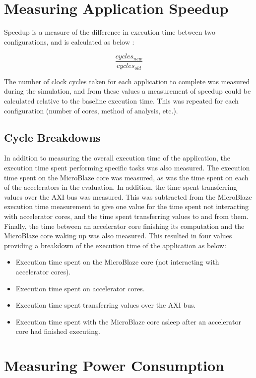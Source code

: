 \documentclass{UoYCSproject}
\begin{document}
\section{Measuring Application Speedup}

Speedup is a measure of the difference in execution time between two configurations, and is calculated as below
\cite{computer-arch}:

\[\frac{cycles_{new}}{cycles_{old}}\]

The number of clock cycles taken for each application to complete was measured during the simulation, and from these
values a measurement of speedup could be calculated relative to the baseline execution time. This was repeated for
each configuration (number of cores, method of analysis, etc.).

\subsection{Cycle Breakdowns}

In addition to measuring the overall execution time of the application, the execution time spent performing
specific tasks was also measured. The execution time spent on the MicroBlaze core was measured, as was the time spent
on each of the accelerators in the evaluation. In addition, the time spent transferring values over the AXI bus was
measured. This was subtracted from the MicroBlaze execution time measurement to give one value for the time spent not
interacting with accelerator cores, and the time spent transferring values to and from them. Finally, the time
between an accelerator core finishing its computation and the MicroBlaze core waking up was also measured.
This resulted in four values providing a breakdown of the execution time of the application as below:

\begin{itemize}
  \item Execution time spent on the MicroBlaze core (not interacting with accelerator cores).
  \item Execution time spent on accelerator cores.
  \item Execution time spent transferring values over the AXI bus.
  \item Execution time spent with the MicroBlaze core asleep after an accelerator core had finished executing.
\end{itemize}

\section{Measuring Power Consumption}
\end{document}

